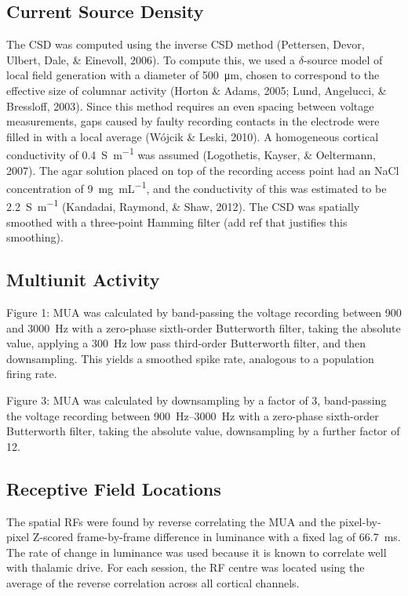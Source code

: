 \subsection{Current Source Density}
The \ac{CSD} was computed using the inverse \ac{CSD} method (Pettersen, Devor, Ulbert, Dale, \& Einevoll, 2006).
To compute this, we used a $\delta$-source model of local field generation with a diameter of \SI{500}{\micro\metre}, chosen to correspond to the effective size of columnar activity (Horton \& Adams, 2005; Lund, Angelucci, \& Bressloff, 2003).
Since this method requires an even spacing between voltage measurements, gaps caused by faulty recording contacts in the electrode were filled in with a local average (W\'ojcik \& Leski, 2010).
A homogeneous cortical conductivity of \SI{0.4}{\siemens\per\metre} was assumed (Logothetis, Kayser, \& Oeltermann, 2007).
The agar solution placed on top of the recording access point had an \ac{NaCl} concentration of \SI{9}{\mg\per\mL}, and the conductivity of this was estimated to be \SI{2.2}{\siemens\per\metre} (Kandadai, Raymond, \& Shaw, 2012).
The \ac{CSD} was spatially smoothed with a three-point Hamming filter (add ref that justifies this smoothing).

\subsection{Multiunit Activity}
Figure 1: \ac{MUA} was calculated by band-passing the voltage recording between 900 and \SI{3000}{Hz} with a zero-phase sixth-order Butterworth filter, taking the absolute value, applying a \SI{300}{Hz} low pass third-order Butterworth filter, and then downsampling.
This yields a smoothed spike rate, analogous to a population firing rate.

Figure 3: \ac{MUA} was calculated by downsampling by a factor of 3, band-passing the voltage recording between \SIrange{900}{3000}{Hz} with a zero-phase sixth-order Butterworth filter, taking the absolute value, downsampling by a further factor of 12.

\subsection{Receptive Field Locations}
The spatial \acp{RF} were found by reverse correlating the \ac{MUA} and the pixel-by-pixel Z-scored frame-by-frame difference in luminance with a fixed lag of \SI{66.7}{ms}.
The rate of change in luminance was used because it is known to correlate well with thalamic drive.
For each session, the \ac{RF} centre was located using the average of the reverse correlation across all cortical channels.

